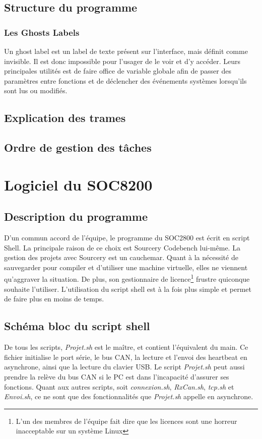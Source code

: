 \documentclass[10pt,a4paper,final]{article}
\begin{document}
\begin{spacing}{1.5}

\subsection{Structure du programme}

\subsubsection{Les Ghosts Labels}
Un ghost label est un label de texte présent sur l'interface, mais définit comme invisible. Il est donc impossible pour l'usager de le voir et d'y accéder. Leurs principales utilités est de faire office de variable globale afin de passer des paramètres entre fonctions et de déclencher des événements systèmes lorsqu'ils sont lus ou modifiés.
\subsection{Explication des trames}

\subsection{Ordre de gestion des tâches}





\pagebreak
\section{Logiciel du SOC8200}
\subsection{Description du programme}
D'un commun accord de l'équipe, le programme du SOC2800 est écrit en script Shell. La principale raison de ce choix est Sourcery Codebench lui-même. La gestion des projets avec Sourcery est un cauchemar. Quant à la nécessité de sauvegarder pour compiler et d'utiliser une machine virtuelle, elles ne viennent qu'aggraver la situation. De plus, son gestionnaire de licence\footnote{L'un des membres de l'équipe fait dire que les licences sont une horreur inacceptable sur un système Linux} frustre quiconque souhaite l'utiliser. L'utilisation du script shell est à la fois plus simple et permet de faire plus en moins de temps.

\subsection{Schéma bloc du script shell}
De tous les scripts, \textit{Projet.sh} est le maître, et contient l'équivalent du main. Ce fichier initialise le port série, le bus CAN, la lecture et l'envoi des heartbeat en asynchrone, ainsi que la lecture du clavier USB. Le script \textit{Projet.sh} peut aussi prendre la relève du bus CAN si le PC est dans l'incapacité d'assurer ses fonctions. Quant aux autres scripts, soit \textit{connexion.sh}, \textit{RxCan.sh}, \textit{tcp.sh} et \textit{Envoi.sh}, ce ne sont que des fonctionnalités que \textit{Projet.sh} appelle en asynchrone.


\end{spacing}
\end{document}
